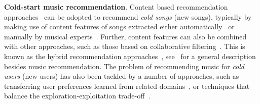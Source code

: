 {\bf Cold-start music recommendation}.
Content based recommendation approaches~\cite[Chapter~4]{aggarwal2016recommender}
can be adopted to recommend {\it cold songs} (\ie new songs),
typically by making use of content features of songs extracted either automatically~\cite{seyerlehner2010automatic,eghbal2015vectors}
or manually by musical experts~\cite{john2006pandora}.
Further, content features can also be combined with other approaches, such as those based on 
collaborative filtering~\cite{yoshii2006hybrid,donaldson2007hybrid,shao2009music}.
This is known as the hybrid recommendation approaches~\cite{burke2002hybrid}, 
see~\cite[Chapter~6]{aggarwal2016recommender} for a general description besides music recommendation.
The problem of recommending music for {\it cold users} (\ie new users) 
has also been tackled by a number of approaches, such as transferring user preferences learned 
from related domains~\cite{hu2010study,aizenberg2012build},
or techniques that balance the exploration-exploitation trade-off~\cite{wang2014exploration,liebman2015dj}.
